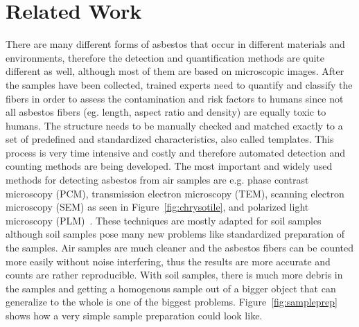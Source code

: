 \section{Related Work}

There are many different forms of asbestos that occur in different materials and environments, therefore the detection and quantification methods are quite different as well, although most of them are based on microscopic images. After the samples have been collected, trained experts need to quantify and classify the fibers in order to assess the contamination and risk factors to humans since not all asbestos fibers (eg. length, aspect ratio and density) are equally toxic to humans. The structure needs to be manually checked and matched exactly to a set of predefined and standardized characteristics, also called templates. This process is very time intensive and costly and therefore automated detection and counting methods are being developed. The most important and widely used methods for detecting asbestos from air samples are e.g. phase contrast microscopy (PCM), transmission electron microscopy (TEM), scanning electron microscopy (SEM) as seen in Figure~\ref{fig:chrysotile}, and polarized light microscopy (PLM)~\cite{perry2004discussion}. These techniques are mostly adapted for soil samples although soil samples pose many new problems like standardized preparation of the samples. Air samples are much cleaner and the asbestos fibers can be counted more easily without noise interfering, thus the results are more accurate and counts are rather reproducible. With soil samples, there is much more debris in the samples and getting a homogenous sample out of a bigger object that can generalize to the whole is one of the biggest problems. Figure~\ref{fig:sampleprep} shows how a very simple sample preparation could look like. \\

